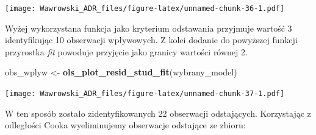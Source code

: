 \documentclass[]{book}
\newenvironment{Shaded}{\begin{snugshade}}{\end{snugshade}}
\newcommand{\DataTypeTok}[1]{\textcolor[rgb]{0.13,0.29,0.53}{#1}}
\newcommand{\KeywordTok}[1]{\textcolor[rgb]{0.13,0.29,0.53}{\textbf{#1}}}
\newcommand{\NormalTok}[1]{#1}
\newcommand{\OperatorTok}[1]{\textcolor[rgb]{0.81,0.36,0.00}{\textbf{#1}}}
\newcommand{\StringTok}[1]{\textcolor[rgb]{0.31,0.60,0.02}{#1}}
\begin{document}
\texttt{[image: Wawrowski\_ADR\_files/figure-latex/unnamed-chunk-36-1.pdf]}

Wyżej wykorzystana funkcja jako kryterium odstawania przyjmuje wartość 3 identyfikując 10 obserwacji wpływowych. Z kolei dodanie do powyższej funkcji przyrostka \emph{fit} powoduje przyjęcie jako granicy wartości równej 2.

\begin{Shaded}
\begin{Highlighting}[]
\NormalTok{obs_wplyw <-}\StringTok{ }\KeywordTok{ols_plot_resid_stud_fit}\NormalTok{(wybrany_model)}
\end{Highlighting}
\end{Shaded}

\texttt{[image: Wawrowski\_ADR\_files/figure-latex/unnamed-chunk-37-1.pdf]}

W ten sposób zostało zidentyfikowanych 22 obserwacji odstających. Korzystając z odległości Cooka wyeliminujemy obserwacje odstające ze zbioru:

\begin{Shaded}
\end{Shaded}
\end{document}
